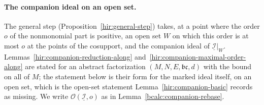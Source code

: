 \paragraph{The companion ideal on an open set.} The general step (Proposition~\ref{hir:general-step}) takes, at a point where the order \(o\) of the
nonmonomial part is positive, an open set \(W\) on which this order is at most \(o\) at the points of the cosupport, and the companion ideal of
\(\underline{\mathcal I}|_W\). Lemmas~\ref{hir:companion-reduction-along} and~\ref{hir:companion-maximal-order-along} are stated for an abstract factorization
\((M,N,E,\mathfrak b\mathfrak c,d)\) with the bound on all of \(M\); the statement below is their form for the marked ideal itself, on an open set, which is the
open-set statement Lemma~\ref{hir:companion-basic} records as missing. We write \(\mathcal O(\underline{\mathcal I},o)\) as in Lemma~\ref{bcalc:companion-rebase}.

